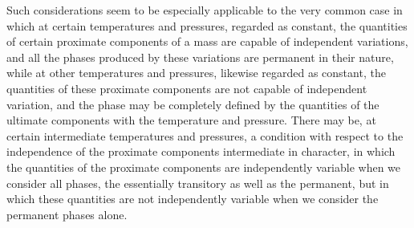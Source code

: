 \documentclass[12pt]{memoir}
\begin{document}
Such considerations seem to be especially applicable to the very common case in which at certain temperatures and pressures, regarded as constant, the quantities of certain proximate components of a mass are capable of independent variations, and all the phases produced by these variations are permanent in their nature, while at other temperatures and pressures, likewise regarded as constant, the
quantities of these proximate components are not capable of independent variation, and the phase may be completely defined by the quantities of the ultimate components with the temperature and pressure. There may be, at certain intermediate temperatures and pressures, a condition with respect to the independence of the proximate components intermediate in character, in which the quantities of the proximate components are independently variable when we consider all phases, the essentially transitory as well as the permanent, but in which these quantities are not independently variable when we consider the permanent phases alone.
\end{document}

